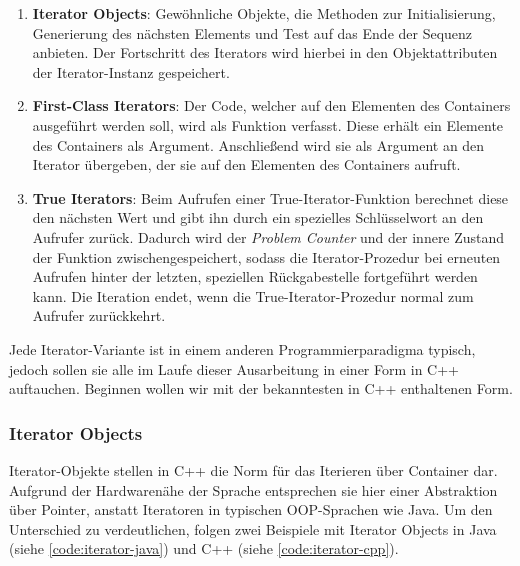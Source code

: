 \documentclass[runningheads]{llncs}
\begin{document}
\begin{enumerate}[1.]
	\label{enum:iterator-types}
	\item \textbf{Iterator Objects}: Gewöhnliche Objekte, die Methoden zur Initialisierung, Generierung des nächsten Elements und Test auf das Ende der Sequenz anbieten.
	      Der Fortschritt des Iterators wird hierbei in den Objektattributen der Iterator-Instanz gespeichert.

	\item \textbf{First-Class Iterators}: Der Code, welcher auf den Elementen des Containers ausgeführt werden soll, wird als Funktion verfasst.
	      Diese erhält ein Elemente des Containers als Argument.
	      Anschließend wird sie als Argument an den Iterator übergeben, der sie auf den Elementen des Containers aufruft.

	\item \textbf{True Iterators}: Beim Aufrufen einer True-Iterator-Funktion berechnet diese den nächsten Wert und gibt ihn durch ein spezielles Schlüsselwort an den Aufrufer zurück.
	      Dadurch wird der \textit{Problem Counter} und der innere Zustand der Funktion zwischengespeichert, sodass die Iterator-Prozedur bei erneuten Aufrufen hinter der letzten, speziellen Rückgabestelle fortgeführt werden kann.
	      Die Iteration endet, wenn die True-Iterator-Prozedur normal zum Aufrufer zurückkehrt.
\end{enumerate}

\noindent Jede Iterator-Variante ist in einem anderen Programmierparadigma typisch, jedoch sollen sie alle im Laufe dieser Ausarbeitung in einer Form in C++ auftauchen.
Beginnen wollen wir mit der bekanntesten in C++ enthaltenen Form.

\subsubsection{Iterator Objects}
\label{text:iterator-objects}

Iterator-Objekte stellen in C++ die Norm für das Iterieren über Container dar.
Aufgrund der Hardwarenähe der Sprache entsprechen sie hier einer Abstraktion über Pointer, anstatt Iteratoren in typischen OOP-Sprachen wie Java.
Um den Unterschied zu verdeutlichen, folgen zwei Beispiele mit Iterator Objects in Java (siehe \autoref{code:iterator-java}) und C++ (siehe \autoref{code:iterator-cpp}).
\end{document}
